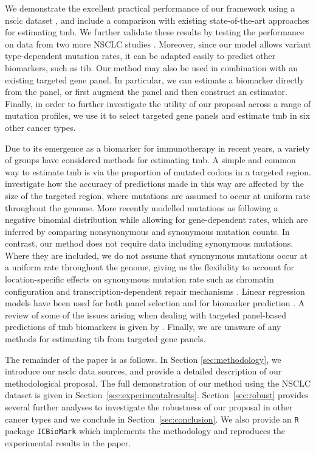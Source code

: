 \documentclass[../thesis.tex]{subfiles}
\begin{document}
We demonstrate the excellent practical performance of our framework using a \gls{nsclc} dataset {\citep{campbell_distinct_2016}}, and include a comparison with existing state-of-the-art approaches for estimating \gls{tmb}. {We further validate these results by testing the performance on data from {two more NSCLC studies \citep{hellmann_genomic_2018, rizvi_mutational_2015}}}.  Moreover, since our model allows variant type-dependent mutation rates, it can be adapted easily to predict other biomarkers, such as \gls{tib}. Our method may also be used in combination with an existing targeted gene panel. In particular, we can estimate a biomarker directly from the panel, or first augment the panel and then construct an estimator.  {Finally, in order to further investigate the utility of our proposal across a range of mutation profiles, we use it to select targeted gene panels and estimate \gls{tmb} in six other cancer types.} 

Due to its emergence as a biomarker for immunotherapy in recent years, a variety of groups have considered methods for estimating \gls{tmb}. A simple and common way to estimate \gls{tmb} is via the proportion of mutated codons in a targeted region. \citet{budczies_optimizing_2019} investigate how the accuracy of predictions made in this way are affected by the size of the targeted region, where mutations are assumed to occur at uniform rate throughout the genome. More recently \citet{yao_ectmb_2020} modelled mutations as following a negative binomial distribution while allowing for gene-dependent rates, which are inferred by comparing nonsynonymous and synonymous mutation counts. In contrast, our method does not require data including synonymous mutations. Where they are included, we do not assume that synonymous mutations occur at a uniform rate throughout the genome, giving us the flexibility to account for location-specific effects on synonymous mutation rate such as chromatin configuration \citep{makova_effects_2015} and transcription-dependent repair mechanisms \citep{fong_intertwined_2013}. Linear regression models have been used for both panel selection \citep{lyu_mutation_2018} and for biomarker prediction \citep{guo_exon_2020}. A review of some of the issues arising when dealing with targeted panel-based predictions of \gls{tmb} biomarkers is given by \citet{wu_designing_2019}. Finally, we are unaware of any methods for estimating \gls{tib} from targeted gene panels. 

The remainder of the paper is as follows. In Section \ref{sec:methodology}, we introduce our \gls{nsclc} data sources, and provide a detailed description of our methodological proposal.  {The full demonstration of our method using the NSCLC dataset is}  given in Section~\ref{sec:experimentalresults}. {Section~\ref{sec:robust} provides several further analyses to investigate the robustness of our proposal in other cancer types} and we conclude in Section~\ref{sec:conclusion}.  We also provide an \texttt{R} package \texttt{ICBioMark} \citep{bradley_icbiomark_2021} which implements the methodology and reproduces the experimental results in the paper. 
\end{document}
